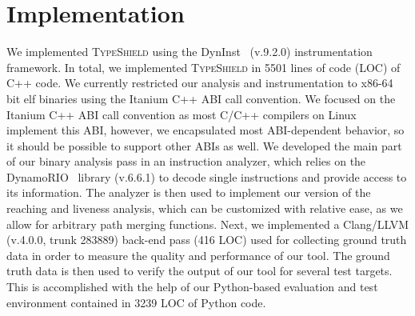 \section{Implementation}
\label{chapter:Implementation}

We implemented \textsc{TypeShield} using the DynInst~\cite{bernat:dyninst} (v.9.2.0) instrumentation framework. 
In total, we implemented \textsc{TypeShield} in 5501 lines of code (LOC) of C++ code.
We currently restricted our analysis and instrumentation to x86-64 
bit elf binaries using the Itanium C++ ABI call convention.
We focused on the Itanium C++ ABI call 
convention as most C/C++ compilers on Linux implement this ABI, however, we encapsulated most ABI-dependent behavior, so it should be 
possible to support other ABIs as well. 
We developed the main part of our binary analysis pass in an instruction analyzer, which relies on the DynamoRIO~\cite{dynamorio:drmemory} library (v.6.6.1)
to decode single instructions and provide access to
its information. 
The analyzer is then used to implement our version of the reaching and liveness analysis, 
which can be customized with relative ease, as we allow for arbitrary path merging functions. 
Next, we implemented a 
Clang/LLVM (v.4.0.0, trunk 283889) back-end pass (416 LOC) used for collecting ground truth data in order to measure the quality and performance of our tool. 
The ground truth data is then used to verify the output of our tool for several test targets.
This is accomplished with the help of our Python-based evaluation and test environment contained in 3239 LOC of Python code. 



